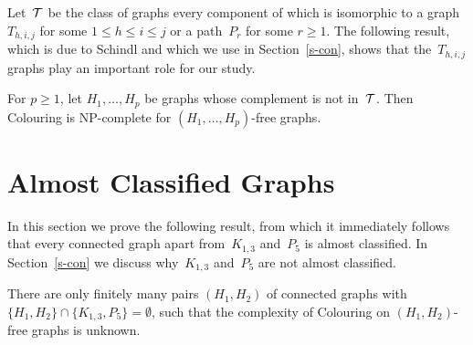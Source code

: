 \documentclass{llncs}
\newcommand{\NP}{{\sf NP}}
\begin{document}
Let~${\cal T}$ be the class of graphs every component of which is isomorphic to a graph~$T_{h,i,j}$ for some $1\leq h\leq i\leq j$ or a path~$P_r$ for some $r\geq 1$.
The following result, which is due to Schindl and which we use in Section~\ref{s-con}, shows that the~$T_{h,i,j}$ graphs play an important role for our study.

\begin{theorem}[\cite{Sc05}]\label{t-schindl}
For $p\geq 1$, let $H_1,\ldots,H_p$ be graphs whose complement is not in~${\cal T}$.
Then {\sc Colouring} is \NP-complete for $(H_1,\ldots,H_p)$-free graphs.
\end{theorem}

\section{Almost Classified Graphs}\label{s-almost}

In this section we prove the following result, from which it immediately follows that every connected graph apart from~$K_{1,3}$ and~$P_5$ is almost classified.
In Section~\ref{s-con} we discuss why~$K_{1,3}$ and~$P_5$ are not almost classified.

\begin{theorem}\label{t-almost1}
There are only finitely many pairs $(H_1,H_2)$ of connected graphs with $\{H_1,H_2\} \cap \{K_{1,3},P_5\}=\emptyset$, such that the complexity of {\sc Colouring} on $(H_1,H_2)$-free graphs is unknown.
\end{theorem}
\end{document}
